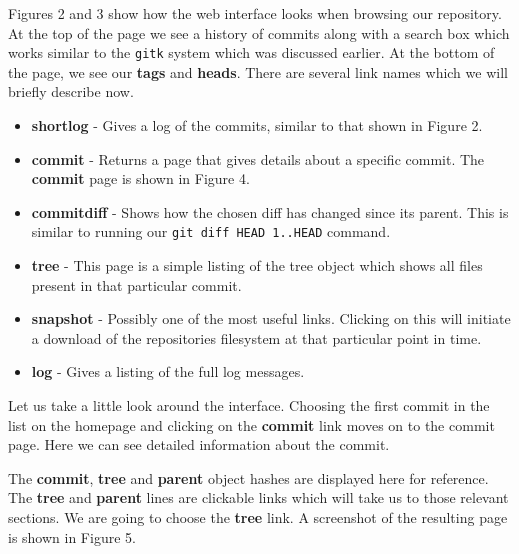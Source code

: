 

Figures 2 and 3 show how the web interface looks when browsing our repository.
At the top of the page we see a history of commits along with a search box which works similar to the \texttt{gitk} system which was discussed earlier.
At the bottom of the page, we see our \textbf{tags} and \textbf{heads}.
There are several link names which we will briefly describe now.

\begin{itemize}
\item {}\textbf{shortlog} - Gives a log of the commits, similar to that shown in Figure 2.
\item {}\textbf{commit} - Returns a page that gives details about a specific commit.
The \textbf{commit} page is shown in Figure 4.
\item {}\textbf{commitdiff} - Shows how the chosen diff has changed since its parent.  
This is similar to running our \texttt{git diff HEAD~1..HEAD} command.
\item {}\textbf{tree} - This page is a simple listing of the tree object which shows all files present in that particular commit.
\item {}\textbf{snapshot} - Possibly one of the most useful links.
Clicking on this will initiate a download of the repositories filesystem at that particular point in time.
\item {}\textbf{log} - Gives a listing of the full log messages.
\end{itemize}

Let us take a little look around the interface.
Choosing the first commit in the list on the homepage and clicking on the \textbf{commit} link moves on to the commit page.
Here we can see detailed information about the commit.


The \textbf{commit}, \textbf{tree} and \textbf{parent} object hashes are displayed here for reference.
The \textbf{tree} and \textbf{parent} lines are clickable links which will take us to those relevant sections.
We are going to choose the \textbf{tree} link.
A screenshot of the resulting page is shown in Figure 5.

